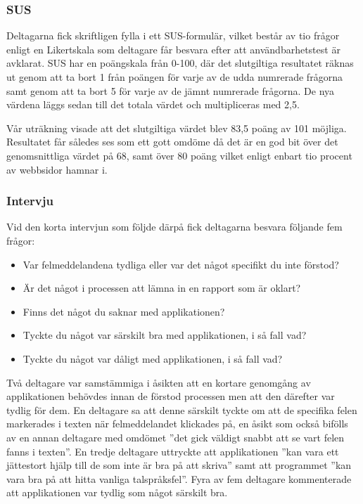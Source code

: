 \documentclass[swedish]{maucsthesis}
\begin{document}
\subsubsection{SUS}

Deltagarna fick skriftligen fylla i ett SUS-formulär, vilket består av tio
frågor enligt en Likertskala som deltagare får besvara efter att
användbarhetstest är avklarat. SUS har en poängskala från 0-100, där det
slutgiltiga resultatet räknas ut genom att ta bort 1 från poängen för varje av
de udda numrerade frågorna samt genom att ta bort 5 för varje av de jämnt
numrerade frågorna. De nya värdena läggs sedan till det totala värdet och
multipliceras med 2,5.

Vår uträkning visade att det slutgiltiga värdet blev 83,5 poäng av 101 möjliga.
Resultatet får således ses som ett gott omdöme då det är en god bit över det
genomsnittliga värdet på 68, samt över 80 poäng vilket enligt
\cite{laubheimer:2018} enbart tio procent av webbsidor hamnar i.

\subsubsection{Intervju}

Vid den korta intervjun som följde därpå fick deltagarna besvara följande fem
frågor:
\begin{itemize}
\item Var felmeddelandena tydliga eller var det något specifikt du inte förstod?
\item Är det något i processen att lämna in en rapport som är oklart?
\item Finns det något du saknar med applikationen?
\item Tyckte du något var särskilt bra med applikationen, i så fall vad?
\item Tyckte du något var dåligt med applikationen, i så fall vad?
\end{itemize}

Två deltagare var samstämmiga i åsikten att en kortare genomgång av
applikationen behövdes innan de förstod processen men att den därefter var
tydlig för dem. En deltagare sa att denne särskilt tyckte om att de specifika
felen markerades i texten när felmeddelandet klickades på, en åsikt som också
bifölls av en annan deltagare med omdömet ”det gick väldigt snabbt att se vart
felen fanns i texten”. En tredje deltagare uttryckte att applikationen ”kan vara
ett jättestort hjälp till de som inte är bra på att skriva” samt att programmet
”kan vara bra på att hitta vanliga talspråksfel”. Fyra av fem deltagare
kommenterade att applikationen var tydlig som något särskilt bra.
\end{document}
